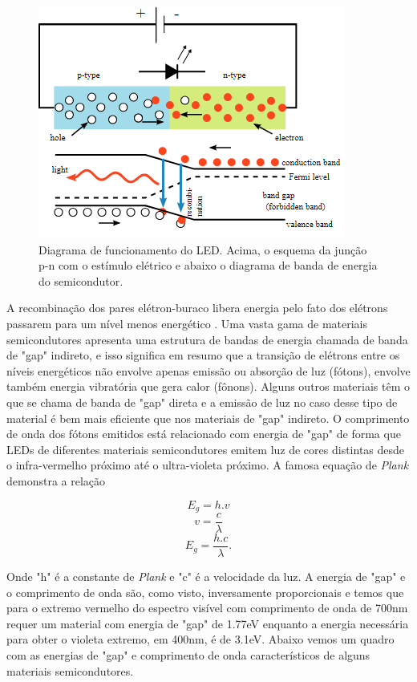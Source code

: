 \begin{figure}[ht]
    \begin{center}
    \includegraphics{figuras/led.PNG}
    \end{center}
    \caption[Diagrama de funcionamento do LED.]{Diagrama de funcionamento do LED. Acima, o esquema da junção p-n com o estímulo elétrico e abaixo o diagrama de banda de energia do semicondutor.}
    \label{led}
\end{figure}


A recombinação dos pares elétron-buraco libera energia pelo fato dos elétrons passarem para um nível menos energético \cite{rezende}. Uma vasta gama de materiais semicondutores apresenta uma estrutura de bandas de energia chamada de banda de "gap" indireto, e isso significa em resumo que a transição de elétrons entre os níveis energéticos não envolve apenas emissão ou absorção de luz (fótons), envolve também energia vibratória que gera calor (fônons). Alguns outros materiais têm o que se chama de banda de "gap" direta e a emissão de luz no caso desse tipo de material é bem mais eficiente que nos materiais de "gap" indireto. O comprimento de onda dos fótons emitidos está relacionado com energia de "gap" de forma que LEDs de diferentes materiais semicondutores emitem luz de cores distintas desde o infra-vermelho próximo até o ultra-violeta próximo. A famosa equação de \textit{Plank} demonstra a relação


    $$  E_g = h.v $$
    $$  v = \frac{c}{\lambda} $$
    $$  E_g = \frac{h.c}{\lambda} .$$
    
Onde "h" é a constante de \textit{Plank} e "c" é a velocidade da luz. A energia de "gap" e o comprimento de onda são, como visto, inversamente proporcionais e temos que para o extremo vermelho do espectro visível com comprimento de onda de 700nm requer um material com energia de "gap" de 1.77eV enquanto a energia necessária para obter o violeta extremo, em 400nm, é de 3.1eV. Abaixo vemos um quadro com as energias de "gap" e comprimento de onda característicos de alguns materiais semicondutores.

